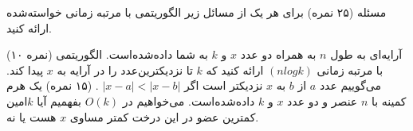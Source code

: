 ‌مسئله
(۲۵ نمره) برای هر یک از مسائل زیر الگوریتمی با مرتبه زمانی خواسته‌شده ارائه کنید.






(۱۰ نمره) آرایه‌ای به طول $n$ به همراه دو عدد $x$ و $k$ به شما داده‌شده‌است. الگوریتمی با مرتبه زمانی
$(nlogk)$
ارائه کنید که $k$ تا نزدیکترین‌عدد را در آرایه به $x$ پیدا کند. می‌گوییم عدد $a$ از $b$ به $x$ نزدیکتر است اگر
$|x-a| < |x-b|$
. 
(۱۵ نمره) یک هرم کمینه با $n$ عنصر و دو عدد $x$ و $k$ داده‌شده‌است. می‌خواهیم در
$O(k)$
بفهمیم آیا $k$امین کمترین عضو در این درخت کمتر مساوی $x$ هست یا نه.











